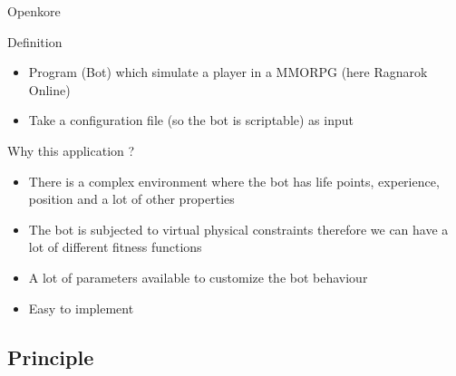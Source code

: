 \begin{frame}{Openkore}

  \begin{block}{Definition}
    \begin{itemize}
    \item Program (Bot) which simulate a player in a MMORPG (here Ragnarok Online)
    \item Take a configuration file (so the bot is scriptable) as input
    \end{itemize}
  \end{block}

  \begin{block}{Why this application ?}
    \begin{itemize}
    \item There is a complex environment where the bot has life points, experience, position and a lot of other properties
    \item The bot is subjected to virtual physical constraints therefore we can have a lot of different fitness functions
    \item A lot of parameters available to customize the bot behaviour
    \item Easy to implement
    \end{itemize}
  \end{block}

\end{frame}
\subsection{Principle}

